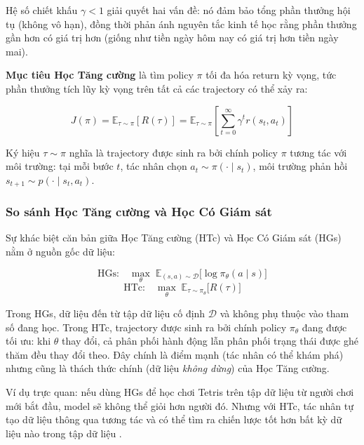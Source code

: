 Hệ số chiết khấu $\gamma < 1$ giải quyết hai vấn đề: nó đảm bảo tổng
phần thưởng hội tụ (không vô hạn), đồng thời phản ánh nguyên tắc kinh
tế học rằng phần thưởng gần hơn có giá trị hơn (giống như tiền ngày
hôm nay có giá trị hơn tiền ngày mai).
 
\textbf{Mục tiêu Học Tăng cường} là tìm policy $\pi$ tối đa hóa return kỳ vọng, tức phần thưởng tích lũy kỳ vọng trên tất cả các trajectory có thể
xảy ra:
 
\begin{equation}
    J(\pi) = \mathbb{E}_{\tau \sim \pi} \left[ R(\tau) \right]
    = \mathbb{E}_{\tau \sim \pi} \left[ \sum_{t=0}^{\infty} \gamma^t
    r(s_t, a_t) \right]
    \label{eq:rl_objective}
\end{equation}

Ký hiệu $\tau \sim \pi$ nghĩa là trajectory được sinh ra bởi chính
policy $\pi$ tương tác với môi trường: tại mỗi bước $t$, tác nhân chọn
$a_t \sim \pi(\cdot \mid s_t)$, môi trường phản hồi
$s_{t+1} \sim p(\cdot \mid s_t, a_t)$.
 
\subsubsection{So sánh Học Tăng cường và Học Có Giám sát}
 
Sự khác biệt căn bản giữa Học Tăng cường (HTc) và Học Có Giám sát (HGs) nằm ở nguồn
gốc dữ liệu:
 
\begin{equation}
    \text{HGs:} \quad \max_\theta \; \mathbb{E}_{(s,a) \sim \mathcal{D}}
    \bigl[\log \pi_\theta(a \mid s)\bigr]
    \label{eq:sl_obj}
\end{equation}
\begin{equation}
    \text{HTc:} \quad \max_\theta \; \mathbb{E}_{\tau \sim \pi_\theta}
    \bigl[R(\tau)\bigr]
    \label{eq:rl_obj_compare}
\end{equation}
 
Trong HGs, dữ liệu đến từ tập dữ liệu cố định $\mathcal{D}$ và không phụ
thuộc vào tham số đang học. Trong HTc, trajectory được sinh ra bởi
chính policy $\pi_\theta$ đang được tối ưu: khi $\theta$ thay đổi,
cả phân phối hành động lẫn phân phối trạng thái được ghé thăm đều thay
đổi theo. Đây chính là điểm mạnh (tác nhân có thể khám phá) nhưng cũng
là thách thức chính (dữ liệu \textit{không dừng}) của Học Tăng cường.
 
Ví dụ trực quan: nếu dùng HGs để học chơi Tetris trên tập dữ liệu từ người
chơi mới bắt đầu, model sẽ không thể giỏi hơn người đó. Nhưng với HTc,
tác nhân tự tạo dữ liệu thông qua tương tác và có thể tìm ra chiến lược
tốt hơn bất kỳ dữ liệu nào trong tập dữ liệu \cite{eysenbach2025generativerl}.
 
